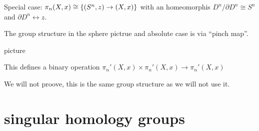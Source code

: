 \documentclass{TemplateLecture}
\begin{document}
Special case: \(\pi_n(X,x) \cong \{(S^n, z) \to (X,x)\}\) with an homeomorphis \(D^n/\partial D^n \cong S^n\) and \(\partial D^n \leftrightarrow z\).

The group structure in the sphere pictrue and absolute case is via \enquote{pinch map}.

picture

This defines a binary operation \(\pi_n'(X,x) \times \pi_n'(X,x) \to \pi_n'(X,x)\)

We will not proove, this is the same group structure as we will not use it.













\section{singular homology groups}
\end{document}
